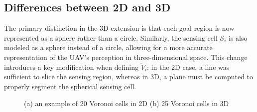     \subsection{Differences between 2D and 3D}
        The primary distinction in the \ac{3D} extension is that each goal region is now represented as a sphere rather than a circle.  
        Similarly, the sensing cell $\mathcal{S}_i$ is also modeled as a sphere instead of a circle, allowing for a more accurate representation of the \ac{UAV}'s perception in three-dimensional space.  
        This change introduces a key modification when defining $\tilde{V}_i$: in the \ac{2D} case, a line was sufficient to slice the sensing region, whereas in \ac{3D}, a plane must be computed to properly segment the spherical sensing cell. 
        
        \begin{figure}[H]
            \centering
            \caption{
                (a) an example of 20 Voronoi cells in \ac{2D} \cite{Voronoi2d} (b) 25 Voronoi cells in \ac{3D} \cite{Voronoi3d}
            }
            \label{fig:voronoi_diagrams}
        \end{figure}
    
